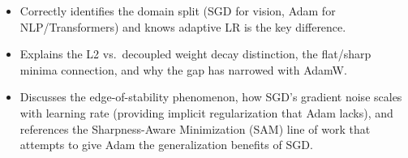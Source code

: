 \begin{interviewq}
\goodgreat
\begin{itemize}
    \item {} Correctly identifies the domain split (SGD for vision, Adam for NLP/Transformers) and knows adaptive LR is the key difference.
    \item {} Explains the L2 vs.\ decoupled weight decay distinction, the flat/sharp minima connection, and why the gap has narrowed with AdamW.
    \item {} Discusses the edge-of-stability phenomenon, how SGD's gradient noise scales with learning rate (providing implicit regularization that Adam lacks), and references the Sharpness-Aware Minimization (SAM) line of work that attempts to give Adam the generalization benefits of SGD.
\end{itemize}

\end{interviewq}


